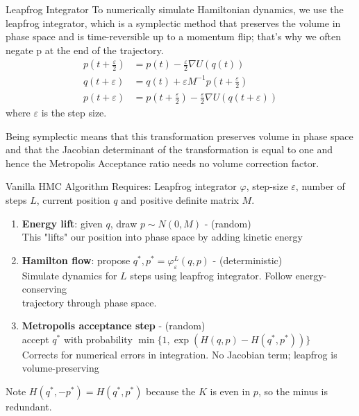 \begin{frame}{Leapfrog Integrator}
	To numerically simulate Hamiltonian dynamics, we use the leapfrog integrator, which is a
	symplectic method that preserves the volume in phase space and is time-reversible
	up to a momentum flip; that’s why we often negate p at the end of the trajectory.
	\begin{align*}
		p\left(t + \frac{\varepsilon}{2}\right) & = p(t) - \frac{\varepsilon}{2} \nabla U(q(t))                                                  \\
		q(t + \varepsilon)                      & = q(t) + \varepsilon M^{-1} p\left(t + \frac{\varepsilon}{2}\right)                            \\
		p(t + \varepsilon)                      & = p\left(t + \frac{\varepsilon}{2}\right) - \frac{\varepsilon}{2} \nabla U(q(t + \varepsilon))
	\end{align*}
	where $\varepsilon$ is the step size.

	\vspace{0.4cm}
	Being symplectic means that this transformation preserves volume in phase space and
	that the Jacobian determinant of the transformation is equal to one and hence the Metropolis
	Acceptance ratio needs no volume correction factor.
\end{frame}

\begin{frame}
	\begin{block}{Vanilla HMC Algorithm}
		Requires: Leapfrog integrator $\varphi$, step-size $\varepsilon$, number of steps $L$, current position $q$
		and positive definite matrix $M$.

		\begin{enumerate}
			\item \textbf{Energy lift}: given $q$, draw $p \sim N(0, M)$  - (random) \\
			      This "lifts" our position into phase space by adding kinetic energy

			\item \textbf{Hamilton flow}: propose $q^*, p^* = \varphi_{\varepsilon}^L(q, p)$ - (deterministic)\\
			      Simulate dynamics for $L$ steps using leapfrog integrator. Follow energy-conserving  \\
			      trajectory through phase space. 

			\item \textbf{Metropolis acceptance step} - (random) \\
			      accept $q^*$ with probability
			      $\min\Big\{1, \exp(H(q, p) - H(q^*, p^*))\Big\}$ \\
			      Corrects for numerical errors in integration. No Jacobian term; leapfrog is volume-preserving
		\end{enumerate}
	\end{block}
	Note $H(q^*, -p^*) = H(q^*, p^*)$ because the $K$ is even in $p$, so the minus is redundant.
\end{frame}

